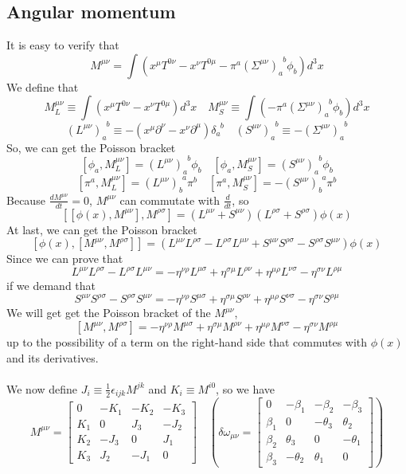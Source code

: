 \documentclass[cyan]{elegantnote}
\begin{document}
\subsection{Angular momentum}
\noindent
It is easy to verify that
\[M^{\mu \nu} = \int (x^{\mu}T^{0\nu}-x^{\nu}T^{0\mu}-\pi^a(\Sigma^{\mu \nu})_{a}^{\phantom{a}b}\phi_b) d^3 x\]
We define that
\[M_{L}^{\mu \nu} \equiv \int (x^{\mu}T^{0\nu}-x^{\nu}T^{0\mu}) d^3 x \quad M_S^{\mu \nu} \equiv \int (-\pi^a(\Sigma^{\mu \nu})_{a}^{\phantom{a}b}\phi_b) d^3 x\]
\[(L^{\mu \nu})_a^{\phantom{a}b} \equiv -(x^{\mu}\partial^{\nu}-x^{\nu}\partial^{\mu})\delta_a^{\phantom{a}b} \quad (S^{\mu \nu})_a^{\phantom{a}b} \equiv -(\Sigma^{\mu \nu})_a^{\phantom{a}b}\]
So, we can get the Poisson bracket
\[[\phi_a,M_L^{\mu \nu}] = (L^{\mu \nu})_a^{\phantom{a}b} \phi_b \quad [\phi_a,M_S^{\mu \nu}] = (S^{\mu \nu})_a^{\phantom{a}b} \phi_b\]
\[[\pi^a,M_L^{\mu \nu}] = (L^{\mu \nu})_b^{\phantom{b}a}\pi^{b}  \quad [\pi^a,M_S^{\mu \nu}] = - (S^{\mu \nu})_b^{\phantom{b}a} \pi^b \]
Because $\frac{d M^{\mu \nu}}{dt} = 0$, $M^{\mu \nu}$ can commutate with $\frac{d}{dt}$, so
\[[[\phi(x),M^{\mu \nu}],M^{\rho \sigma}] = (L^{\mu \nu}+S^{\mu \nu})(L^{\rho \sigma}+S^{\rho \sigma})\phi(x)\]
At last, we can get the Poisson bracket 
\[[\phi(x),[M^{\mu \nu},M^{\rho \sigma}]] = (L^{\mu \nu}L^{\rho \sigma}-L^{\rho \sigma}L^{\mu \nu} + S^{\mu \nu}S^{\rho \sigma}-S^{\rho \sigma}S^{\mu \nu})\phi(x)\]
Since we can prove that
\[L^{\mu \nu}L^{\rho \sigma}-L^{\rho \sigma}L^{\mu \nu} = -\eta^{\nu \rho}L^{\mu \sigma} + \eta^{\sigma \mu}L^{\rho \nu} + \eta^{\mu \rho}L^{\nu \sigma} - \eta^{\sigma \nu}L^{\rho \mu}\]
if we demand that
\[S^{\mu \nu}S^{\rho \sigma}-S^{\rho \sigma}S^{\mu \nu} = -\eta^{\nu \rho}S^{\mu \sigma} + \eta^{\sigma \mu}S^{\rho \nu} + \eta^{\mu \rho}S^{\nu \sigma} - \eta^{\sigma \nu}S^{\rho \mu}\]
We will get get the Poisson bracket of the $M^{\mu \nu}$,
\[[M^{\mu \nu},M^{\rho \sigma}] = -\eta^{\nu \rho}M^{\mu \sigma} + \eta^{\sigma \mu}M^{\rho \nu} + \eta^{\mu \rho}M^{\nu \sigma} - \eta^{\sigma \nu}M^{\rho \mu}\]
up to the possibility of a term on the right-hand side that commutes with $\phi(x)$ and its derivatives.\\ \\
We now define $J_i \equiv \frac{1}{2} \epsilon_{ijk} M^{jk}$ and $K_i \equiv M^{i0}$, so we have
\[M^{\mu \nu} = \left[ 
\begin{matrix} 
0   & -K_1 & -K_2 & -K_3 \\ 
K_1 & 0    & J_3  & -J_2 \\
K_2 & -J_3 & 0    &  J_1 \\
K_3 & J_2  & -J_1 &  0
\end{matrix} 
\right] \quad \left( 
\delta \omega_{\mu\nu} = \left[
\begin{matrix} 
0       & -\beta_1   & -\beta_2   & -\beta_3   \\ 
\beta_1 & 0         & -\theta_3 & \theta_2  \\
\beta_2 & \theta_3  & 0         & -\theta_1 \\
\beta_3 & -\theta_2 & \theta_1  & 0
\end{matrix} 
\right] \right)\] 
\end{document}
